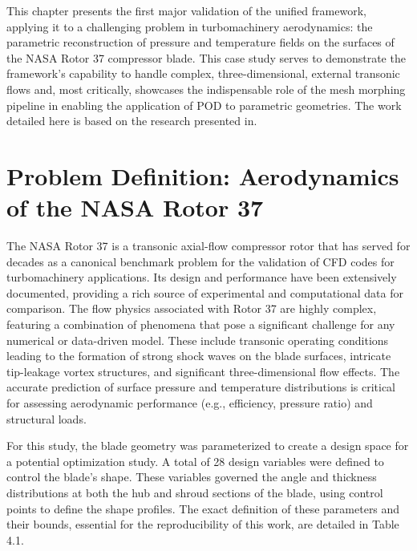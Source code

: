 \documentclass[dsc, EN]{ufabcFHZh}
\begin{document}
This chapter presents the first major validation of the unified framework, applying it to a challenging problem in turbomachinery aerodynamics: the parametric reconstruction of pressure and temperature fields on the surfaces of the NASA Rotor 37 compressor blade. This case study serves to demonstrate the framework's capability to handle complex, three-dimensional, external transonic flows and, most critically, showcases the indispensable role of the mesh morphing pipeline in enabling the application of POD to parametric geometries. The work detailed here is based on the research presented in. 

\section{Problem Definition: Aerodynamics of the NASA Rotor 37}

The NASA Rotor 37 is a transonic axial-flow compressor rotor that has served for decades as a canonical benchmark problem for the validation of CFD codes for turbomachinery applications. Its design and performance have been extensively documented, providing a rich source of experimental and computational data for comparison. The flow physics associated with Rotor 37 are highly complex, featuring a combination of phenomena that pose a significant challenge for any numerical or data-driven model. These include transonic operating conditions leading to the formation of strong shock waves on the blade surfaces, intricate tip-leakage vortex structures, and significant three-dimensional flow effects. The accurate prediction of surface pressure and temperature distributions is critical for assessing aerodynamic performance (e.g., efficiency, pressure ratio) and structural loads. 

For this study, the blade geometry was parameterized to create a design space for a potential optimization study. A total of 28 design variables were defined to control the blade's shape. These variables governed the angle and thickness distributions at both the hub and shroud sections of the blade, using control points to define the shape profiles. The exact definition of these parameters and their bounds, essential for the reproducibility of this work, are detailed in Table 4.1.
\end{document}
